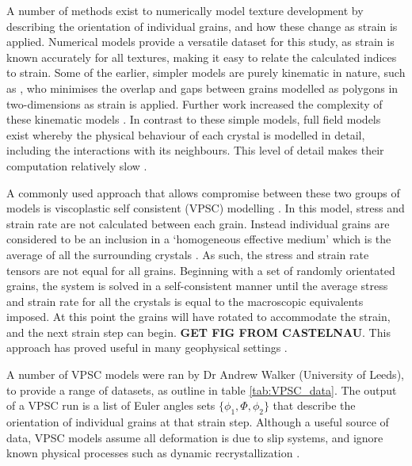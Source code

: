 \documentclass[a4paper,12pt,twoside]{report}
\numberwithin{equation}{chapter}
\begin{document}
A number of methods exist to numerically model texture development by describing the orientation of individual grains, and how these change as strain is applied. Numerical models provide a versatile dataset for this study, as strain is known accurately for all textures, making it easy to relate the calculated indices to strain. Some of the earlier, simpler models are purely kinematic in nature, such as \cite{Etchecopar1977}, who minimises the overlap and gaps between grains modelled as polygons in two-dimensions as strain is applied. Further work increased the complexity of these kinematic models \citep[e.g. using differential equations,][]{Ribe1989}. In contrast to these simple models, full field models \citep[e.g. finite element,][]{Sarma1996} exist whereby the physical behaviour of each crystal is modelled in detail, including the interactions with its neighbours. This level of detail makes their computation relatively slow \cite{Goulding2015}.

A commonly used approach that allows compromise between these two groups of models is viscoplastic self consistent (VPSC) modelling \citep{Molinari1987,Lebensohn1993}. In this model, stress and strain rate are not calculated between each grain. Instead individual grains are considered to be an inclusion in a \lq{}homogeneous effective medium\rq{} which is the average of all the surrounding crystals \citep[i.e. nearest neighbour effects are not taken into account][]{Castelnau1996}. As such, the stress and strain rate tensors are not equal for all grains. Beginning with a set of randomly orientated grains, the system is solved in a self-consistent manner until the average stress and strain rate for all the crystals is equal to the macroscopic equivalents imposed. At this point the grains will have rotated to accommodate the strain, and the next strain step can begin. \textbf{GET FIG FROM CASTELNAU}. This approach has proved useful in many geophysical settings \citep[e.g.][]{Wenk1999}.

A number of VPSC models were ran by Dr Andrew Walker (University of Leeds), to provide a range of datasets, as outline in table \ref{tab:VPSC_data}. The output of a VPSC run is a list of Euler angles sets $\{\phi_1,\Phi,\phi_2\}$ that describe the orientation of individual grains at that strain step. Although a useful source of data, VPSC models assume all deformation is due to slip systems, and ignore known physical processes such as dynamic recrystallization \citep[see,][]{Tommasi2000}.      
\end{document}
